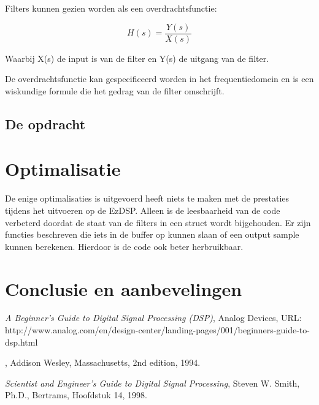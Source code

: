 \documentclass[11pt,a4paper]{article}
\begin{document}
Filters kunnen gezien worden als een overdrachtsfunctie:
 
\[
    H(s) = \frac{Y(s)}{X(s)}
\]	

Waarbij X(s) de input is van de filter en Y(s) de uitgang van de filter. 

De overdrachtsfunctie kan gespecificeerd worden in het frequentiedomein en is een wiskundige formule die het gedrag van de filter omschrijft. 

		
	\subsection{De opdracht}		
		
	
	

	\section{Optimalisatie}
	De enige optimalisaties is uitgevoerd heeft niets te maken met de prestaties tijdens het uitvoeren op de EzDSP. Alleen is de leesbaarheid van de code verbeterd doordat de staat van de filters in een struct wordt bijgehouden. Er zijn functies beschreven die iets in de buffer op kunnen slaan of een output sample kunnen berekenen. Hierdoor is de code ook beter herbruikbaar. 
	

	\section{Conclusie en aanbevelingen}
	
	
	
		
	\begin{thebibliography}{9}

  		
  		\textit{A Beginner's Guide to Digital Signal Processing (DSP)},
  		Analog Devices,
  		URL: http://www.analog.com/en/design-center/landing-pages/001/beginners-guide-to-dsp.html 

	
	\bibitem{}
  		
  		\textit{},
  		Addison Wesley, Massachusetts,
  		2nd edition,
  		1994.
  		
  		
  		\textit{Scientist and Engineer's Guide to Digital Signal Processing},
  		Steven W. Smith, Ph.D., 
  		Bertrams,
  		Hoofdstuk 14,
  		1998.  		
		
	\end{thebibliography}
\end{document}
